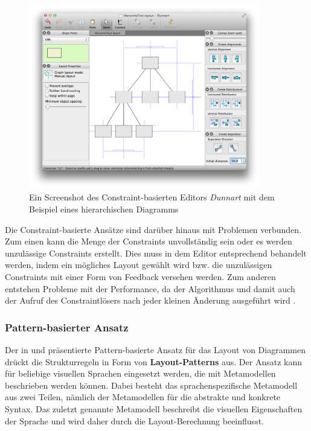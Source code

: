 \begin{figure}[hbt]
    \centering
    \includegraphics[width=0.9\textwidth]{resources/dunnart-screenshot}
    \caption{Ein Screenshot des Constraint-basierten Editors \textit{Dunnart} mit dem Beispiel eines hierarchischen Diagramms}
    \label{fig:dunnart-screenshot}
\end{figure}

Die Constraint-basierte Ansätze sind darüber hinaus mit Problemen verbunden. Zum einen kann die Menge der Constraints unvollständig sein oder es werden unzulässige Constraints erstellt. Dies muss in dem Editor entsprechend behandelt werden, indem ein mögliches Layout gewählt wird bzw. die unzulässigen Constraints mit einer Form von Feedback versehen werden. Zum anderen entstehen Probleme mit der Performance, da der Algorithmus und damit auch der Aufruf des Constraintlösers  nach jeder kleinen Änderung ausgeführt wird \cite{Maier12A-Pattern-based}.

\subsubsection{Pattern-basierter Ansatz}
\label{subsubsec:pattern-based-approach}

Der in \cite{Maier12A-Pattern-based} und \cite{MaierMinas10Combination} präsentierte Pattern-basierte Ansatz für das Layout von Diagrammen drückt die Strukturregeln in Form von \textbf{Layout-Patterns} aus. Der Ansatz kann für beliebige visuellen Sprachen eingesetzt werden, die mit Metamodellen beschrieben werden können. Dabei besteht das sprachenspezifische Metamodell aus zwei Teilen, nämlich der Metamodellen für die abstrakte und konkrete Syntax. Das zuletzt genannte Metamodell beschreibt die visuellen Eigenschaften der Sprache und wird daher durch die Layout-Berechnung beeinflusst.

